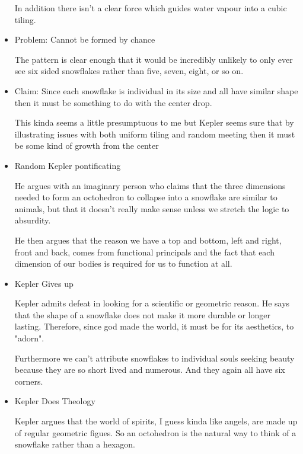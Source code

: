 \documentclass{report}
\begin{document}
\begin{itemize}
\begin{mdframed}
            In addition there isn't a clear force which
            guides water vapour into a cubic tiling.
        \end{mdframed}
    \item Problem: Cannot be formed by chance
        \begin{mdframed}
            The pattern is clear enough that it would
            be incredibly unlikely to only ever see
            six sided snowflakes rather than five,
            seven, eight, or so on.
        \end{mdframed}
    \item Claim: Since each snowflake is individual in its
        size and all have similar shape then it must be
        something to do with the center drop.
        \begin{mdframed}
            This kinda seems a little presumptuous to me
            but Kepler seems sure that by illustrating
            issues with both uniform tiling and random
            meeting then it must be some kind of growth from
            the center
        \end{mdframed}
    \item Random Kepler pontificating
        \begin{mdframed}
            He argues with an imaginary person who claims
            that the three dimensions needed to form an
            octohedron to collapse into a snowflake are
            similar to animals, but that it doesn't really
            make sense unless we stretch the logic
            to absurdity.

            He then argues that the reason we have a top
            and bottom, left and right, front and back,
            comes from functional principals and the fact
            that each dimension of our bodies is required
            for us to function at all.
        \end{mdframed}
    \item Kepler Gives up
        \begin{mdframed}
            Kepler admits defeat in looking for a scientific
            or geometric reason. He says that the shape
            of a snowflake does not make it more durable
            or longer lasting. Therefore, since
            god made the world, it must be for its
            aesthetics, to "adorn".

            Furthermore we can't attribute snowflakes to
            individual souls seeking beauty because they are
            so short lived and numerous. And they again
            all have six corners.
        \end{mdframed}
    \item Kepler Does Theology
        \begin{mdframed}
            Kepler argues that the world of spirits,
            I guess kinda like angels, are made up of 
            regular geometric figues. So an octohedron
            is the natural way to think of a snowflake rather
            than a hexagon.


\end{mdframed}
\end{itemize}
\end{document}
